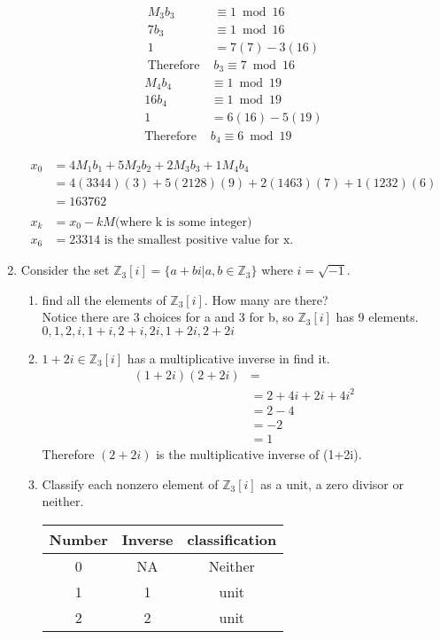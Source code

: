 \documentclass{article}
\newcommand{\Z}{\mathbb{Z}}
\begin{document}
\begin{enumerate}
\begin{multicols}{2}
			\begin{align*}
				M_3b_3 &\equiv1 \bmod{16}\\
				7b_3 &\equiv1 \bmod{16}\\
				1  &= 7(7)-3(16)\\
				\text{Therefore } & b_3\equiv 7 \bmod{16}
			\end{align*}
			\begin{align*}
				M_4b_4 &\equiv1 \bmod{19}\\
				16b_4 &\equiv1 \bmod{19}\\
				1  &= 6(16)-5(19)\\
				\text{Therefore } & b_4\equiv 6 \bmod{19}
			\end{align*}
		\end{multicols}
			\begin{align*}
				x_0  &= 4M_1b_1 + 5M_2b_2+ 2M_3b_3 + 1M_4b_4\\
				     &= 4(3344)(3)+5(2128)(9)+ 2(1463)(7)+1(1232)(6)\\
				     &= 163762\\
				     \\
				x_k  &= x_0 - kM  \text{(where k is some integer)}\\
				x_6  &= 23314 \text{ is the smallest positive value for x.}				
			\end{align*}
		
		
		\item Consider the set $\Z_3[i] = \{ a+bi |a,b \in \Z_3 \}$ where $i = \sqrt{-1}$.
		\begin{enumerate}
			\item find all the elements of $\Z_3[i]$. How many are there?\\
			Notice there are 3 choices for a and 3 for b, so $\Z_3[i]$ has 9 elements.\\ 
			$0, 1 , 2, 
			i, 1+i, 2+i, 
			2i, 1+2i, 2+2i $
			
			\item $1+2i \in \Z_3[i] $ has a multiplicative inverse in find it.
			 \begin{align*}
			 	(1+2i)(2+2i) &=\\
			 		&= 2+4i+2i +4i^2 \\
			 		&= 2-4 \\
			 		&= -2 \\
			 		&= 1
			 \end{align*}
			 Therefore $(2+2i)$ is the multiplicative inverse of  (1+2i).
			 
			\item Classify each nonzero element of $\Z_3[i]$ as a unit, a zero divisor or 
			neither. 
			\begin{table}[htbp]
				\centering
				\begin{tabular}{|c|c|c|}
					\hline
					Number & Inverse & classification\\
					\hline
					\hline
					0 & NA & Neither \\
					\hline
					1 & 1 & unit \\
					\hline
					2 & 2 & unit\\
					\hline
					

\end{tabular}
\end{table}
\end{enumerate}
\end{enumerate}
\end{document}
